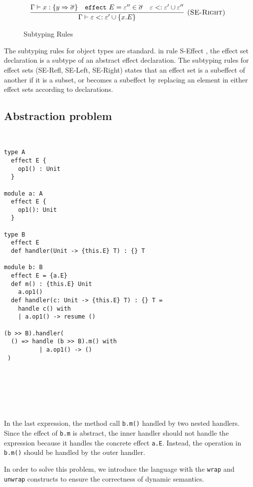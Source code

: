 \documentclass{article}
\theoremstyle{definition}
\newcommand{\keywadj}[1]{\mathtt{#1}}
\newcommand{\keyw}[1]{\keywadj{#1}~}
\begin{document}
\begin{figure}[H]
{\[\begin{array}{c}
\infer[\textsc{(SE-Right)}]
  {\Gamma \vdash \varepsilon <: \varepsilon' \cup \{x.E\}}
  {\Gamma \vdash x : \{y \Rightarrow \overline{\sigma}\} & \keyw{effect} E = \varepsilon'' \in \overline{\sigma} & \varepsilon  <: \varepsilon' \cup \varepsilon''  } 
  
  
\end{array}
\]

}
\caption{Subtyping Rules}
\end{figure}

The subtyping rules for object types are standard. in rule S-Effect , the effect set declaration is a subtype of an abstract effect declaration. The subtyping rules for effect sets (SE-Refl, SE-Left, SE-Right) states that an effect set is a subeffect of another if it is a subset, or becomes a subeffect by replacing an element in either effect sets according to declarations.

\pagebreak
\subsection{Abstraction problem}
\begin{verbatim}


type A
  effect E {
    op1() : Unit
  }
  
module a: A
  effect E {
    op1(): Unit
  }

type B
  effect E 
  def handler(Unit -> {this.E} T) : {} T
  
module b: B
  effect E = {a.E}
  def m() : {this.E} Unit
    a.op1()
  def handler(c: Unit -> {this.E} T) : {} T = 
    handle c() with
    | a.op1() -> resume ()

(b >> B).handler(
  () => handle (b >> B).m() with
          | a.op1() -> ()
 )

 
 
 
 
 
\end{verbatim}

In the last expression, the method call \texttt{b.m()} handled by two nested handlers. Since the effect of \texttt{b.m} is abstract, the inner handler should not handle the expression because it handles the concrete effect \texttt{a.E}. Instead, the operation in \texttt{b.m()} should be handled by the outer handler.

In order to solve this problem, we introduce the language with the \texttt{wrap} and \texttt{unwrap} constructs to ensure the correctness of dynamic semantics.


\pagebreak
\end{document}
